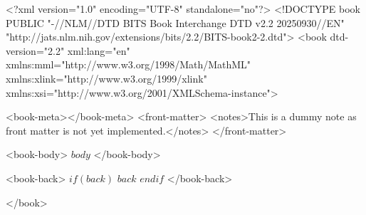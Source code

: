 <?xml version="1.0" encoding="UTF-8" standalone="no"?>
<!DOCTYPE book PUBLIC "-//NLM//DTD BITS Book Interchange DTD v2.2 20250930//EN" "http://jats.nlm.nih.gov/extensions/bits/2.2/BITS-book2-2.dtd">
<book
dtd-version="2.2" xml:lang="en" 
xmlns:mml="http://www.w3.org/1998/Math/MathML" 
xmlns:xlink="http://www.w3.org/1999/xlink" 
xmlns:xsi="http://www.w3.org/2001/XMLSchema-instance">

<book-meta></book-meta>
<front-matter>
<notes>This is a dummy note as front matter is not yet implemented.</notes>
</front-matter>

<book-body>
$body$
</book-body>

<book-back>
$if(back)$
$back$
$endif$
</book-back>

</book>
